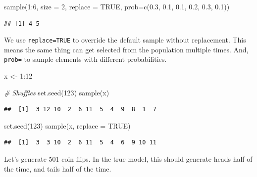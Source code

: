 \documentclass[
]{book}
\newenvironment{Shaded}{\begin{snugshade}}{\end{snugshade}}
\newcommand{\AttributeTok}[1]{\textcolor[rgb]{0.77,0.63,0.00}{#1}}
\newcommand{\CommentTok}[1]{\textcolor[rgb]{0.56,0.35,0.01}{\textit{#1}}}
\newcommand{\ConstantTok}[1]{\textcolor[rgb]{0.00,0.00,0.00}{#1}}
\newcommand{\DecValTok}[1]{\textcolor[rgb]{0.00,0.00,0.81}{#1}}
\newcommand{\FloatTok}[1]{\textcolor[rgb]{0.00,0.00,0.81}{#1}}
\newcommand{\FunctionTok}[1]{\textcolor[rgb]{0.00,0.00,0.00}{#1}}
\newcommand{\NormalTok}[1]{#1}
\newcommand{\OtherTok}[1]{\textcolor[rgb]{0.56,0.35,0.01}{#1}}
\newcommand{\SpecialCharTok}[1]{\textcolor[rgb]{0.00,0.00,0.00}{#1}}
\begin{document}
\begin{Shaded}
\begin{Highlighting}[]
\FunctionTok{sample}\NormalTok{(}\DecValTok{1}\SpecialCharTok{:}\DecValTok{6}\NormalTok{, }\AttributeTok{size =} \DecValTok{2}\NormalTok{, }\AttributeTok{replace =} \ConstantTok{TRUE}\NormalTok{, }\AttributeTok{prob=}\FunctionTok{c}\NormalTok{(}\FloatTok{0.3}\NormalTok{, }\FloatTok{0.1}\NormalTok{, }\FloatTok{0.1}\NormalTok{, }\FloatTok{0.2}\NormalTok{, }\FloatTok{0.3}\NormalTok{, }\FloatTok{0.1}\NormalTok{))}
\end{Highlighting}
\end{Shaded}

\begin{verbatim}
## [1] 4 5
\end{verbatim}

We use \texttt{replace=TRUE} to override the default sample without replacement. This means the same thing can get selected from the population multiple times. And, \texttt{prob=} to sample elements with different probabilities.

\begin{Shaded}
\begin{Highlighting}[]
\NormalTok{x }\OtherTok{\textless{}{-}} \DecValTok{1}\SpecialCharTok{:}\DecValTok{12}

\CommentTok{\# Shuffles}
\FunctionTok{set.seed}\NormalTok{(}\DecValTok{123}\NormalTok{)}
\FunctionTok{sample}\NormalTok{(x)}
\end{Highlighting}
\end{Shaded}

\begin{verbatim}
##  [1]  3 12 10  2  6 11  5  4  9  8  1  7
\end{verbatim}

\begin{Shaded}
\begin{Highlighting}[]
\FunctionTok{set.seed}\NormalTok{(}\DecValTok{123}\NormalTok{)}
\FunctionTok{sample}\NormalTok{(x, }\AttributeTok{replace =} \ConstantTok{TRUE}\NormalTok{)}
\end{Highlighting}
\end{Shaded}

\begin{verbatim}
##  [1]  3  3 10  2  6 11  5  4  6  9 10 11
\end{verbatim}

Let's generate 501 coin flips. In the true model, this should generate heads half of the time, and tails half of the time.
\end{document}
